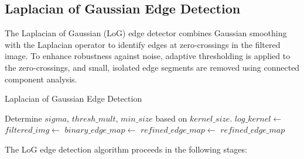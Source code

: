 \documentclass[12pt,a4paper]{article}
\begin{document}
\subsection{Laplacian of Gaussian Edge Detection} \label{subsec:log_impl}


The Laplacian of Gaussian (LoG) edge detector combines Gaussian smoothing with the Laplacian operator to identify edges at zero-crossings in the filtered image. To enhance robustness against noise, adaptive thresholding is applied to the zero-crossings, and small, isolated edge segments are removed using connected component analysis.

\begin{algorithm}[H]
    \caption{Laplacian of Gaussian Edge Detection}
    \begin{algorithmic}[1]
            \State Determine $sigma$, $thresh\_mult$, $min\_size$ based on $kernel\_size$.
            \State $log\_kernel \gets$ 
            \State $filtered\_img \gets$ 
            \State $binary\_edge\_map \gets$ 
            \State $refined\_edge\_map \gets$ 
            \State \Return $refined\_edge\_map$
        \EndFunction
    \end{algorithmic}
\end{algorithm}

The LoG edge detection algorithm proceeds in the following stages:
\end{document}
